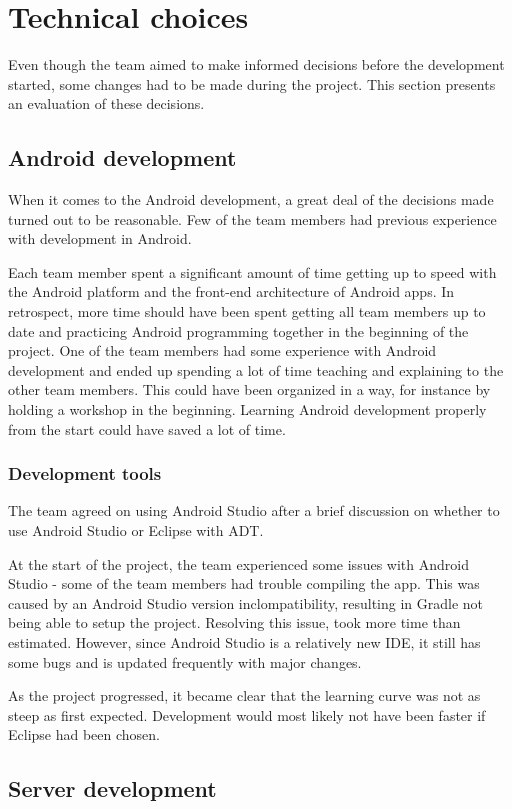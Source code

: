 \section{Technical choices}
Even though the team aimed to make informed decisions before the development started, some changes had to be made during the project. This section presents an evaluation of these decisions.

\subsection{Android development}
When it comes to the Android development, a great deal of the decisions made turned out to be reasonable. Few of the team members had previous experience with development in Android.

Each team member spent a significant amount of time getting up to speed with the Android platform and the front-end architecture of Android apps. In retrospect, more time should have been spent getting all team members up to date and practicing Android programming together in the beginning of the project. One of the team members had some experience with Android development and ended up spending a lot of time teaching and explaining to the other team members. This could have been organized in a way, for instance by holding a workshop in the beginning. Learning Android development properly from the start could have saved a lot of time.

\subsubsection{Development tools}
The team agreed on using Android Studio after a brief discussion on whether to use Android Studio or Eclipse with ADT.
 
At the start of the project, the team experienced some issues with Android Studio - some of the team members had trouble compiling the app. This was caused by an Android Studio version inclompatibility, resulting in Gradle not being able to setup the project. Resolving this issue, took more time than estimated. However, since Android Studio is a relatively new IDE, it still has some bugs and is updated frequently with major changes.

As the project progressed, it became clear that the learning curve was not as steep as first expected. Development would most likely not have been faster if Eclipse had been chosen.


\subsection{Server development}

